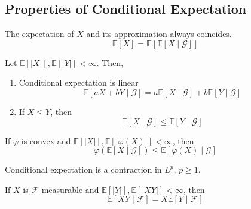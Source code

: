 \documentclass{article}
\begin{document}
  \subsection{Properties of Conditional Expectation}

    \begin{theorem}
      The expectation of $X$ and its approximation always coincides. 
      \begin{equation}
        \mathbb{E}[X] = \mathbb{E}[\mathbb{E}[X \mid \mathcal{G}]]
      \end{equation}
    \end{theorem}

    \begin{lemma}
      Let $\mathbb{E}[|X|] , \mathbb{E}[|Y|] < \infty$. Then, 
      \begin{enumerate}
        \item Conditional expectation is linear
        \begin{equation}
          \mathbb{E}[a X + b Y \mid \mathcal{G}] = a \mathbb{E}[X \mid \mathcal{G}] + b \mathbb{E}[Y \mid \mathcal{G}]
        \end{equation}
        
        \item If $X \leq Y$, then 
        \begin{equation}
          \mathbb{E}[X \mid \mathcal{G}] \leq \mathbb{E}[Y \mid \mathcal{G}]
        \end{equation}
      \end{enumerate}
    \end{lemma}

    \begin{theorem}
      If $\varphi$ is convex and $\mathbb{E}[|X|], \mathbb{E}[|\varphi(X)|] < \infty$, then 
      \begin{equation}
        \varphi(\mathbb{E}[X \mid \mathcal{G}]) \leq \mathbb{E}[\varphi(X) \mid \mathcal{G}]
      \end{equation}
    \end{theorem}

    \begin{theorem}
      Conditional expectation is a contraction in $L^p$, $p \geq 1$. 
    \end{theorem}

    \begin{theorem}
      If $X$ is $\mathcal{F}$-measurable and $\mathbb{E}[|Y|], \mathbb{E}[|XY|] < \infty$, then 
      \begin{equation}
        \mathbb{E}[XY \mid \mathcal{F}] = X \mathbb{E}[Y \mid \mathcal{F}]
      \end{equation}
    \end{theorem}
\end{document}
